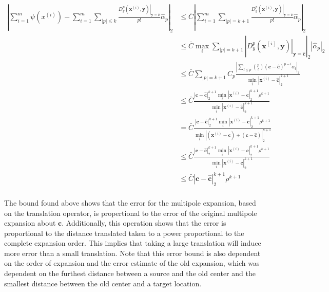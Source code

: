 \documentclass{article}[11pt]
\newcommand{\bvec}[1]{\boldsymbol{#1}}
\begin{document}
   \begin{align*}
   \left| \sum_{i=1}^m \psi(x^{(i)}) - \sum_{i=1}^m \sum_{|p| \leq k} \frac{ \left. D_{y}^{p}(\bvec{x}^{(i)},\bvec{y}) \right|_{\bvec{y}=\bvec{\hat{c}}}}{p!} \hat{\alpha}_p \right|_2 &\leq \bar{C} \left| \sum_{i=1}^m \sum_{|p| = k+1} \frac{ \left. D_{y}^{p}(\bvec{x}^{(i)},\bvec{y}) \right|_{\bvec{y}=\bvec{\hat{c}}}}{p!} \hat{\alpha}_p \right|_2 \\
   &\leq \bar{C} \max_{i} \sum_{|p| = k+1} \left| \left. D_{y}^{p}(\bvec{x}^{(i)},\bvec{y}) \right|_{\bvec{y}=\bvec{\hat{c}}} \right|_2 \left| \hat{\alpha}_p \right|_2 \\
   &\leq \bar{C} \sum_{|p| = k+1} C_p \frac{\left| \sum_{ l \leq p } \binom{p}{l}\left(\bvec{c} - \bvec{\hat{c}} \right)^{p - l} \alpha_l \right|_2}{\min_i |\bvec{x}^{(i)} - \bvec{\hat{c}}|_2^{k+1}} \\
   &\leq \bar{C} \frac{ \left| \bvec{c} - \bvec{\hat{c}}\right|_2^{k+1} \min_i \left|\bvec{x}^{(i)} - \bvec{c}\right|_2^{k+1} \rho^{k+1} }{\min_i |\bvec{x}^{(i)} - \bvec{\hat{c}}|_2^{k+1}} \\
   &= \bar{C} \frac{ \left| \bvec{c} - \bvec{\hat{c}}\right|_2^{k+1} \min_i \left|\bvec{x}^{(i)} - \bvec{c}\right|_2^{k+1} \rho^{k+1} }{\min_i | \left(\bvec{x}^{(i)} - \bvec{c}\right) + \left(\bvec{c} - \bvec{\hat{c}}\right)|_2^{k+1}} \\
   &\leq \bar{C} \frac{ \left| \bvec{c} - \bvec{\hat{c}}\right|_2^{k+1} \min_i \left|\bvec{x}^{(i)} - \bvec{c}\right|_2^{k+1} \rho^{k+1} }{\min_i | \bvec{x}^{(i)} - \bvec{c} |_2^{k+1}} \\
   &\leq \bar{C} \left| \bvec{c} - \bvec{\hat{c}}\right|_2^{k+1} \rho^{k+1} \\
   \end{align*}

   The bound found above shows that the error for the multipole expansion, based on the translation operator, is propertional to the error of the original multipole expansion about $\bvec{c}$. Additionally, this operation shows that the error is proportional to the distance translated taken to a power proportional to the complete expansion order. This implies that taking a large translation will induce more error than a small translation. Note that this error bound is also dependent on the order of expansion and the error estimate of the old expansion, which was dependent on the furthest distance between a source and the old center and the smallest distance between the old center and a target location.
\end{document}
